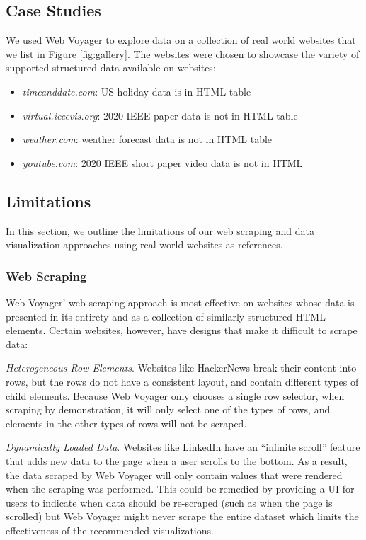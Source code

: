 \documentclass{vgtc}                          %
\begin{document}
\subsection{Case Studies}

We used Web Voyager to explore data on a collection of real world
websites that we list in Figure \ref{fig:gallery}. The websites were chosen to showcase
the variety of supported structured data available on websites:

\begin{itemize}
 \item \emph{timeanddate.com}: US holiday data is in HTML table
 \item \emph{virtual.ieeevis.org}: 2020 IEEE paper data is not in HTML table
 \item \emph{weather.com}: weather forecast data is not in HTML table
 \item \emph{youtube.com}: 2020 IEEE short paper video data is not in HTML
\end{itemize}


\subsection{Limitations}

In this section, we outline the limitations of our web scraping and data
visualization approaches using real world websites as references.

\subsubsection{Web Scraping}

Web Voyager' web scraping approach is most effective on websites whose
data is presented in its entirety and as a collection of similarly-structured HTML elements.
Certain websites, however, have designs that make it difficult to scrape
data:

\emph{Heterogeneous Row Elements}. Websites like HackerNews break their content into rows, but the rows do
not have a consistent layout, and contain different types of child
elements. Because Web Voyager only chooses a single row selector, when
scraping by demonstration, it will only select one of the types of rows,
and elements in the other types of rows will not be scraped.

\emph{Dynamically Loaded Data}. Websites like LinkedIn have an ``infinite scroll'' feature that adds new
data to the page when a user scrolls to the bottom. As a result, the
data scraped by Web Voyager will only contain values that were rendered
when the scraping was performed. This could be remedied by providing a UI for users
to indicate when data should be re-scraped (such as when the page is scrolled) but Web Voyager
might never scrape the entire dataset which limits the effectiveness of the recommended visualizations.
\end{document}
